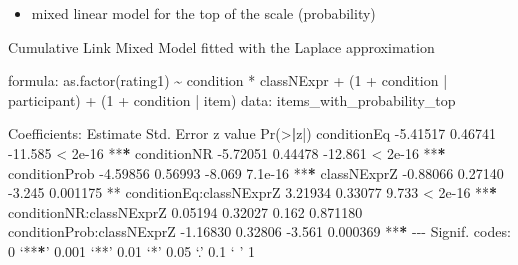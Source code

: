 \documentclass[
  ignorenonframetext,
]{beamer}
\newenvironment{Shaded}{\begin{snugshade}}{\end{snugshade}}
\newcommand{\DecValTok}[1]{\textcolor[rgb]{0.00,0.00,0.81}{#1}}
\newcommand{\ErrorTok}[1]{\textcolor[rgb]{0.64,0.00,0.00}{\textbf{#1}}}
\newcommand{\FloatTok}[1]{\textcolor[rgb]{0.00,0.00,0.81}{#1}}
\newcommand{\FunctionTok}[1]{\textcolor[rgb]{0.00,0.00,0.00}{#1}}
\newcommand{\NormalTok}[1]{#1}
\newcommand{\SpecialCharTok}[1]{\textcolor[rgb]{0.00,0.00,0.00}{#1}}
\providecommand{\tightlist}{%
  \setlength{\itemsep}{0pt}\setlength{\parskip}{0pt}}
\begin{document}
\begin{frame}[fragile]
\begin{itemize}
\tightlist
\item
  mixed linear model for the top of the scale (probability)
\end{itemize}

\footnotesize

\begin{Shaded}
\begin{Highlighting}[]
\NormalTok{Cumulative Link Mixed Model fitted with the Laplace approximation}

\NormalTok{formula}\SpecialCharTok{:} \FunctionTok{as.factor}\NormalTok{(rating1) }\SpecialCharTok{\textasciitilde{}}\NormalTok{ condition }\SpecialCharTok{*}\NormalTok{ classNExpr }\SpecialCharTok{+}\NormalTok{ (}\DecValTok{1} \SpecialCharTok{+}\NormalTok{ condition }\SpecialCharTok{|}  
\NormalTok{    participant) }\SpecialCharTok{+}\NormalTok{ (}\DecValTok{1} \SpecialCharTok{+}\NormalTok{ condition }\SpecialCharTok{|}\NormalTok{ item)}
\NormalTok{data}\SpecialCharTok{:}\NormalTok{    items\_with\_probability\_top}

\NormalTok{Coefficients}\SpecialCharTok{:}
\NormalTok{                          Estimate Std. Error z value }\FunctionTok{Pr}\NormalTok{(}\SpecialCharTok{\textgreater{}}\ErrorTok{|}\NormalTok{z}\SpecialCharTok{|}\NormalTok{)    }
\NormalTok{conditionEq               }\SpecialCharTok{{-}}\FloatTok{5.41517}    \FloatTok{0.46741} \SpecialCharTok{{-}}\FloatTok{11.585}  \SpecialCharTok{\textless{}} \FloatTok{2e{-}16} \SpecialCharTok{**}\ErrorTok{*}
\NormalTok{conditionNR               }\SpecialCharTok{{-}}\FloatTok{5.72051}    \FloatTok{0.44478} \SpecialCharTok{{-}}\FloatTok{12.861}  \SpecialCharTok{\textless{}} \FloatTok{2e{-}16} \SpecialCharTok{**}\ErrorTok{*}
\NormalTok{conditionProb             }\SpecialCharTok{{-}}\FloatTok{4.59856}    \FloatTok{0.56993}  \SpecialCharTok{{-}}\FloatTok{8.069}  \FloatTok{7.1e{-}16} \SpecialCharTok{**}\ErrorTok{*}
\NormalTok{classNExprZ               }\SpecialCharTok{{-}}\FloatTok{0.88066}    \FloatTok{0.27140}  \SpecialCharTok{{-}}\FloatTok{3.245} \FloatTok{0.001175} \SpecialCharTok{**} 
\NormalTok{conditionEq}\SpecialCharTok{:}\NormalTok{classNExprZ    }\FloatTok{3.21934}    \FloatTok{0.33077}   \FloatTok{9.733}  \SpecialCharTok{\textless{}} \FloatTok{2e{-}16} \SpecialCharTok{**}\ErrorTok{*}
\NormalTok{conditionNR}\SpecialCharTok{:}\NormalTok{classNExprZ    }\FloatTok{0.05194}    \FloatTok{0.32027}   \FloatTok{0.162} \FloatTok{0.871180}    
\NormalTok{conditionProb}\SpecialCharTok{:}\NormalTok{classNExprZ }\SpecialCharTok{{-}}\FloatTok{1.16830}    \FloatTok{0.32806}  \SpecialCharTok{{-}}\FloatTok{3.561} \FloatTok{0.000369} \SpecialCharTok{**}\ErrorTok{*}
\SpecialCharTok{{-}{-}{-}}
\NormalTok{Signif. codes}\SpecialCharTok{:}  \DecValTok{0}\NormalTok{ ‘}\SpecialCharTok{**}\ErrorTok{*}\NormalTok{’ }\FloatTok{0.001}\NormalTok{ ‘}\SpecialCharTok{**}\NormalTok{’ }\FloatTok{0.01}\NormalTok{ ‘}\SpecialCharTok{*}\NormalTok{’ }\FloatTok{0.05}\NormalTok{ ‘.’ }\FloatTok{0.1}\NormalTok{ ‘ ’ }\DecValTok{1}
\end{Highlighting}
\end{Shaded}


\end{frame}
\end{document}
